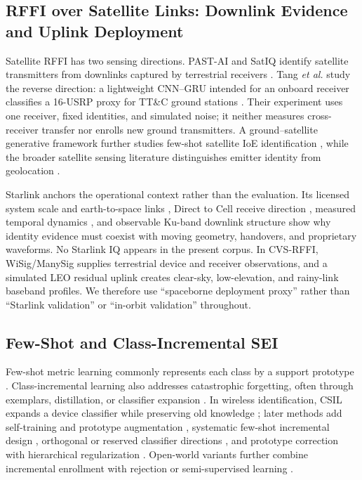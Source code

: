 \documentclass[journal]{IEEEtran}
\newcommand{\method}{CVS-RFFI}
\begin{document}
\subsection{RFFI over Satellite Links: Downlink Evidence and Uplink Deployment}

Satellite RFFI has two sensing directions. PAST-AI and SatIQ identify satellite transmitters from downlinks captured by terrestrial receivers \cite{oligeri2023pastai,smailes2023satiq}. Tang \emph{et al.} study the reverse direction: a lightweight CNN--GRU intended for an onboard receiver classifies a 16-USRP proxy for TT\&C ground stations \cite{tang2023ttc}. Their experiment uses one receiver, fixed identities, and simulated noise; it neither measures cross-receiver transfer nor enrolls new ground transmitters. A ground--satellite generative framework further studies few-shot satellite IoE identification \cite{zhao2026gsgl}, while the broader satellite sensing literature distinguishes emitter identity from geolocation \cite{hendy2026beyondgnss}.

Starlink anchors the operational context rather than the evaluation. Its licensed system scale and earth-to-space links \cite{fcc2022starlinkgen2}, Direct to Cell receive direction \cite{spacex2025directtocell}, measured temporal dynamics \cite{ma2023starlink}, and observable Ku-band downlink structure \cite{humphreys2023starlink} show why identity evidence must coexist with moving geometry, handovers, and proprietary waveforms. No Starlink IQ appears in the present corpus. In \method, WiSig/ManySig supplies terrestrial device and receiver observations, and a simulated LEO residual uplink creates clear-sky, low-elevation, and rainy-link baseband profiles. We therefore use ``spaceborne deployment proxy'' rather than ``Starlink validation'' or ``in-orbit validation'' throughout.

\subsection{Few-Shot and Class-Incremental SEI}

Few-shot metric learning commonly represents each class by a support prototype \cite{snell2017prototypical}. Class-incremental learning also addresses catastrophic forgetting, often through exemplars, distillation, or classifier expansion \cite{rebuffi2017icarl,li2018lwf}. In wireless identification, CSIL expands a device classifier while preserving old knowledge \cite{liu2021csil}; later methods add self-training and prototype augmentation \cite{li2024selftraining}, systematic few-shot incremental design \cite{shi2025dpds}, orthogonal or reserved classifier directions \cite{li2025fscilsei}, and prototype correction with hierarchical regularization \cite{li2025mopchr}. Open-world variants further combine incremental enrollment with rejection or semi-supervised learning \cite{han2025openrfi,zhang2026ofscil,zhao2026cdsil}.
\end{document}
